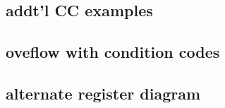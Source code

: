 

\subsection{addt'l CC examples} %


\subsection{oveflow with condition codes}


\subsection{alternate register diagram}




